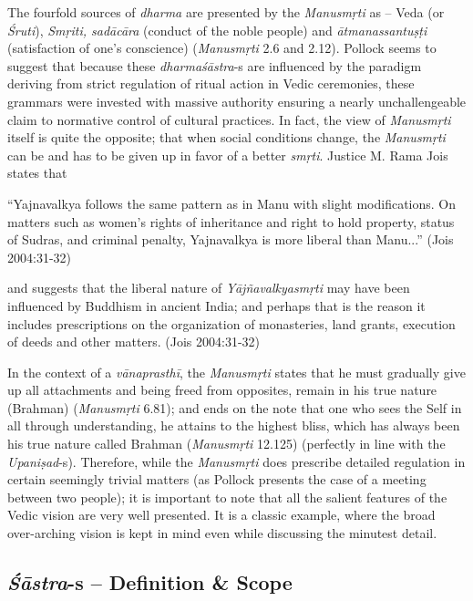 The fourfold sources of {\sl dharma} are presented by the {\sl Manusmṛti} as -- Veda (or {\sl Śruti}), {\sl Smṛiti, sadācāra} (conduct of the noble people) and {\sl ātmanassantuṣṭi} (satisfaction of one's conscience) ({\sl Manusmṛti} 2.6 and 2.12). Pollock seems to suggest that because these {\sl dharmaśāstra}-s are influenced by the paradigm deriving from strict regulation of ritual action in Vedic ceremonies, these grammars were invested with massive authority ensuring a nearly unchallengeable claim to normative control of cultural practices. In fact, the view of {\sl Manusmṛti} itself is quite the opposite; that when social conditions change, the {\sl Manusmṛti} can be and has to be given up in favor of a better {\sl smṛti}. Justice M. Rama Jois states that
\begin{myquote}
``Yajnavalkya follows the same pattern as in Manu with slight modifications. On matters such as women's rights of inheritance and right to hold property, status of Sudras, and criminal penalty, Yajnavalkya is more liberal than Manu...'' (Jois 2004:31-32)
\end{myquote}
and suggests that the liberal nature of {\sl Yājñavalkyasmṛti} may have been influenced by Buddhism in ancient India; and perhaps that is the reason it includes prescriptions on the organization of monasteries, land grants, execution of deeds and other matters. (Jois 2004:31-32)

In the context of a {\sl vānaprasthī}, the {\sl Manusmṛti} states that he must gradually give up all attachments and being freed from opposites, remain in his true nature (Brahman) ({\sl Manusmṛti} 6.81); and ends on the note that one who sees the Self in all through understanding, he attains to the highest bliss, which has always been his true nature called Brahman ({\sl Manusmṛti} 12.125) (perfectly in line with the {\sl Upaniṣad}-s). Therefore, while the {\sl Manusmṛti} does prescribe detailed regulation in certain seemingly trivial matters (as Pollock presents the case of a meeting between two people); it is important to note that all the salient features of the Vedic vision are very well presented. It is a classic example, where the broad over-arching vision is kept in mind even while discussing the minutest detail.

\newpage

\subsection{{{\sl\bfseries Śāstra}\relax}-s -- Definition \& Scope}\label{art12-sec3.4}

